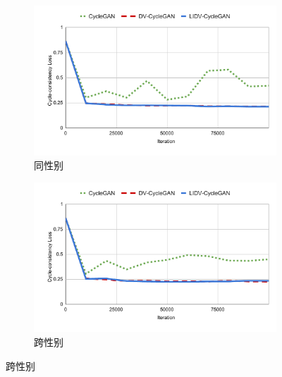 \begin{figure}[!ht]
    \begin{minipage}[b]{\linewidth}
        \begin{subfigure}[b]{0.48\linewidth}
            \centering
            \includegraphics[width=\linewidth,trim=0 0 0 0,clip]{figure/5_cycle1.pdf}
            \caption{同性别}
        \end{subfigure}        
        \begin{subfigure}[b]{0.48\linewidth}
            \centering
            \includegraphics[width=\linewidth,trim=0 0 0 0,clip]{figure/5_cycle2.pdf}
            \caption{跨性别}
        \end{subfigure}   
    \end{minipage}
    \label{fig:re}
\end{figure}


